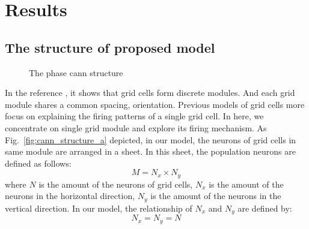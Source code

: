 \documentclass[preprint,12pt]{elsarticle}
\begin{document}
\section{Results}

\subsection{The structure of proposed model}\label{subsection:structure}

\begin{figure}[!t]
	\centering
	\hspace{-2pt}	

	\caption{The phase cann structure}
	\label{fig:cann_structure}
\end{figure}


In the reference \cite{Stensola2012}, it shows that grid cells form discrete modules. And each grid module shares a common spacing, orientation\cite{Rowland2016}. Previous models of grid cells more focus on explaining the firing patterns of a single grid cell. In here, we concentrate on single grid module and explore its firing mechanism. As Fig.~\ref{fig:cann_structure_a} depicted, in our model, the neurons of grid cells in same module are arranged in a sheet. In this sheet, the population neurons are defined as follows:
\begin{equation}
	M = N_x \times N_y
\end{equation}
where $N$ is the amount of the neurons of grid cells, $N_x$ is the amount of the neurons in the horizontal direction, $N_y$ is the amount of the neurons in the vertical direction. In our model, the relationship of $N_x$ and $N_y$ are defined by:
\begin{equation}\label{eq:network_size}
	N_x = N_y = N
\end{equation}
\end{document}
